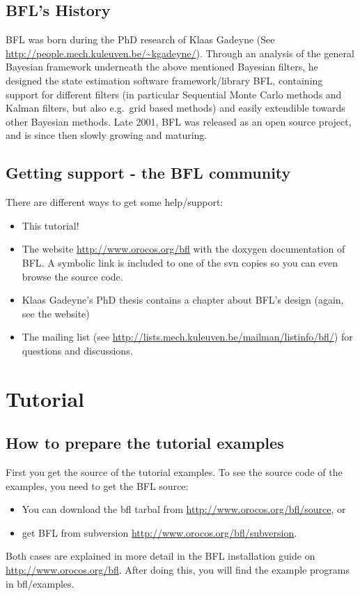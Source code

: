 \documentclass[a4paper,10pt]{report}
\begin{document}
\section{BFL's History}
BFL was born during the PhD research of Klaas Gadeyne (See
\url{http://people.mech.kuleuven.be/~kgadeyne/}).  Through an analysis
of the general Bayesian framework underneath the above mentioned
Bayesian filters, he designed the state estimation software
framework/library BFL, containing support for different filters (in
particular Sequential Monte Carlo methods and Kalman filters, but also
e.g.~grid based methods) and easily extendible towards other Bayesian
methods. Late 2001, BFL was released as an open source project, and is
since then slowly growing and maturing.

\section{Getting support - the BFL community}
There are different ways to get some help/support:
\begin{itemize}
\item This tutorial!
\item The website
  \url{http://www.orocos.org/bfl} with the
  doxygen documentation of BFL. A symbolic link is included to one of
  the svn copies so you can even browse the source code.
\item Klaas Gadeyne's PhD thesis contains a chapter about BFL's design
  (again, see the website)
\item The mailing list (see
  \url{http://lists.mech.kuleuven.be/mailman/listinfo/bfl/}) for
  questions and discussions.
\end{itemize}







\chapter{Tutorial}
\label{chapt:tutorial}
\section{How to prepare the tutorial examples}

First you get the source of the tutorial examples. To see the source
code of the examples, you need to get the BFL source:
\begin{itemize}
\item You can download the bfl tarbal from \url{http://www.orocos.org/bfl/source}, or
\item get BFL from subversion \url{http://www.orocos.org/bfl/subversion}.
\end{itemize}
Both cases are explained in more detail in the BFL installation guide on
\url{http://www.orocos.org/bfl}. After doing this, you will find the example
programs in bfl/examples.
\end{document}
